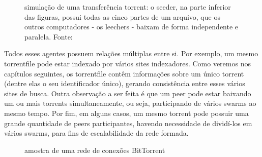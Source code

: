 \begin{figure}[H]
    \vspace{\myvsize}

    \begin{subfigure}[H]{\myhsize}
        \caption{}
        \label{fig:torrent-repr-9}
    \end{subfigure}

    \caption{simulação de uma transferência torrent: o seeder, na parte
    inferior das figuras, possui todas as cinco partes de um arquivo, que os outros
    computadores - os leechers - baixam de forma independente e paralela. Fonte:
    \cite{fig:torrent-dl}}
    \label{fig:torrent-repr}
\end{figure}

Todos esses agentes possuem relações múltiplas entre si. Por exemplo, um mesmo
\gls*{torrentfile} pode estar indexado por vários sites indexadores. Como veremos nos
capítulos seguintes, os \gls*{torrentfile} contêm informações sobre um único
\gls*{torrent} (dentre elas o seu identificador único), gerando consistência entre esses
vários sites de busca. Outra observação a ser feita é que um \gls*{peer} pode estar
baixando um ou mais \glspl*{torrent} simultaneamente, ou seja, participando de vários
\glspl*{swarm} ao mesmo tempo. Por fim, em alguns casos, um mesmo \gls*{torrent} pode
possuir uma grande quantidade de \glspl*{peer} participantes, havendo necessidade de
dividí-los em vários \glspl*{swarm}, para fins de escalabilidade da rede formada.

\begin{figure}[H]
    \centering
    \caption{amostra de uma rede de conexões BitTorrent}
    \label{fig:torrent-universo}
\end{figure}




